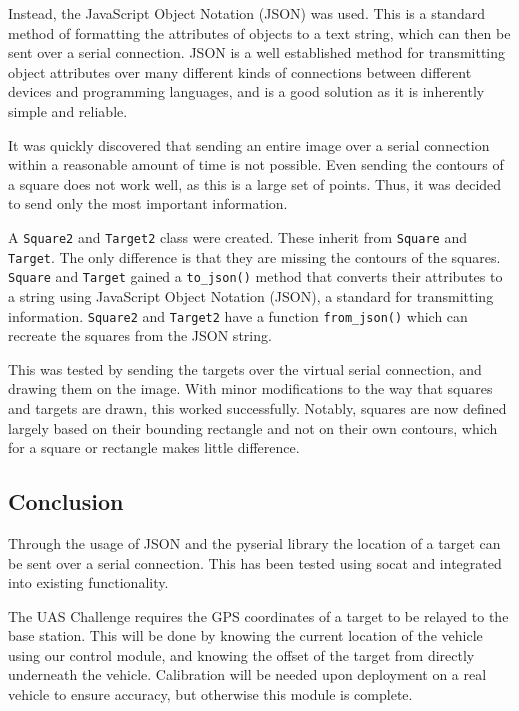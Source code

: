 \documentclass[11pt,twoside]{article}
\begin{document}
Instead, the JavaScript Object Notation (JSON) was used. This is a standard method of formatting the attributes of objects to a text string, which can then be sent over a serial connection. JSON is a well established method for transmitting object attributes over many different kinds of connections between different devices and programming languages, and is a good solution as it is inherently simple and reliable.

It was quickly discovered that sending an entire image over a serial connection within a reasonable amount of time is not possible. Even sending the contours of a square does not work well, as this is a large set of points. Thus, it was decided to send only the most important information.

A \lstinline|Square2| and \lstinline|Target2| class were created. These inherit from \lstinline|Square| and \lstinline|Target|. The only difference is that they are missing the contours of the squares. \lstinline|Square| and \lstinline|Target| gained a \lstinline|to_json()| method that converts their attributes to a string using JavaScript Object Notation (JSON), a standard for transmitting information. \lstinline|Square2| and \lstinline|Target2| have a function \lstinline|from_json()| which can recreate the squares from the JSON string.

This was tested by sending the targets over the virtual serial connection, and drawing them on the image. With minor modifications to the way that squares and targets are drawn, this worked successfully. Notably, squares are now defined largely based on their bounding rectangle and not on their own contours, which for a square or rectangle makes little difference.

\subsection{Conclusion}
Through the usage of JSON and the pyserial library the location of a target can be sent over a serial connection. This has been tested using socat and integrated into existing functionality.

The UAS Challenge requires the GPS coordinates of a target to be relayed to the base station. This will be done by knowing the current location of the vehicle using our control module, and knowing the offset of the target from directly underneath the vehicle. Calibration will be needed upon deployment on a real vehicle to ensure accuracy, but otherwise this module is complete.
\end{document}
